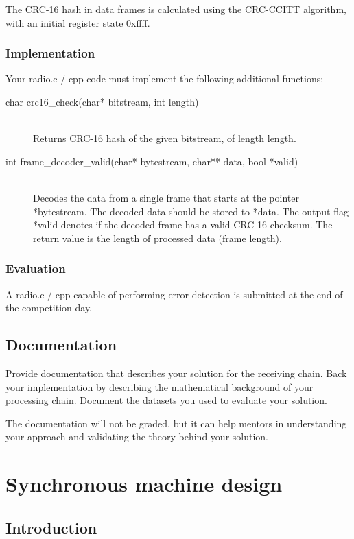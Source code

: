 \documentclass{article}
\begin{document}
The CRC-16 hash in data frames is calculated using the CRC-CCITT algorithm, with an initial register state \textsf{0xffff}.

\subsubsection{Implementation}
Your \textsf{radio.c / cpp} code must implement the following additional functions:
\begin{description}
	\item[char crc16\_check(char* bitstream, int length)]
	\,\\ Returns CRC-16 hash of the given \textsf{bitstream}, of length \textsf{length}.
	\item[int frame\_decoder\_valid(char* bytestream, char** data, bool *valid)]
	\,\\ Decodes the data from a single frame that starts at the pointer \textsf{*bytestream}. The decoded data should be stored to \textsf{*data}. The output flag \textsf{*valid} denotes if the decoded frame has a valid CRC-16 checksum. The return value is the length of processed data (frame length).
\end{description}

\subsubsection{Evaluation}

A \textsf{radio.c / cpp} capable of performing error detection is submitted at the end of the competition day.

\subsection{Documentation}

Provide documentation that describes your solution for the receiving chain. Back your implementation by describing the mathematical background of your processing chain. Document the datasets you used to evaluate your solution.

The documentation will not be graded, but it can help mentors in understanding your approach and validating the theory behind your solution.
	
\newpage
\section{Synchronous machine design}

\subsection{Introduction}
\end{document}
